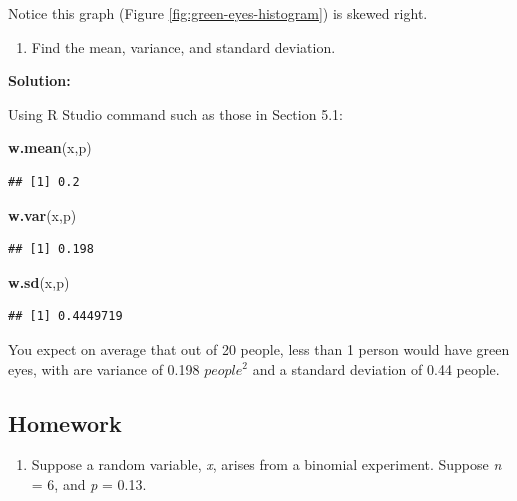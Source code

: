 \documentclass[]{book}
\newenvironment{Shaded}{\begin{snugshade}}{\end{snugshade}}
\newcommand{\KeywordTok}[1]{\textcolor[rgb]{0.13,0.29,0.53}{\textbf{#1}}}
\newcommand{\NormalTok}[1]{#1}
\providecommand{\tightlist}{%
  \setlength{\itemsep}{0pt}\setlength{\parskip}{0pt}}
\begin{document}
Notice this graph (Figure \ref{fig:green-eyes-histogram}) is skewed right.

\begin{enumerate}
\def\labelenumi{\alph{enumi}.}
\setcounter{enumi}{3}
\tightlist
\item
  Find the mean, variance, and standard deviation.
\end{enumerate}

\textbf{Solution:}

Using R Studio command such as those in Section 5.1:

\begin{Shaded}
\begin{Highlighting}[]
\KeywordTok{w.mean}\NormalTok{(x,p)}
\end{Highlighting}
\end{Shaded}

\begin{verbatim}
## [1] 0.2
\end{verbatim}

\begin{Shaded}
\begin{Highlighting}[]
\KeywordTok{w.var}\NormalTok{(x,p)}
\end{Highlighting}
\end{Shaded}

\begin{verbatim}
## [1] 0.198
\end{verbatim}

\begin{Shaded}
\begin{Highlighting}[]
\KeywordTok{w.sd}\NormalTok{(x,p)}
\end{Highlighting}
\end{Shaded}

\begin{verbatim}
## [1] 0.4449719
\end{verbatim}

You expect on average that out of 20 people, less than 1 person would have green eyes, with are variance of 0.198 \(people^2\) and a standard deviation of 0.44 people.

\hypertarget{homework-16}{%
\subsection{Homework}\label{homework-16}}

\begin{enumerate}
\def\labelenumi{\arabic{enumi}.}
\tightlist
\item
  Suppose a random variable, \emph{x}, arises from a binomial experiment. Suppose \emph{n} = 6, and \emph{p} = 0.13.
\end{enumerate}
\end{document}
